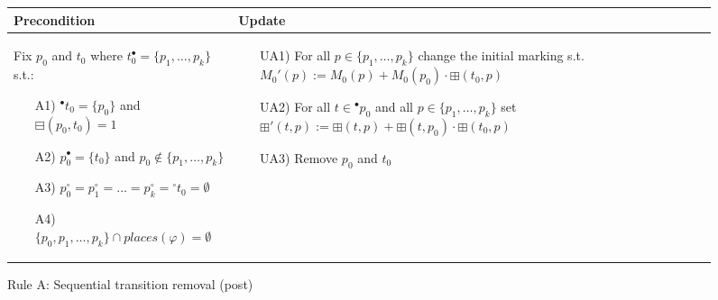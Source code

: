 \begin{figure}[h]
    \begin{adjustbox}{center}
        \begin{tabular}{|p{70mm}|p{62mm}|} \hline
        Precondition & Update \\ \hline
        Fix $p_0$ and $t_0$ where $t_0^\bullet=\{p_1,\dotsc,p_k\}$ s.t.:
        \begin{itemize}[leftmargin=10mm]
            \item[A1)] ${}^\bullet t_0=\{p_0\}$ and $\boxminus(p_0, t_0)=1$
            \item[A2)] $p_0^\bullet=\{t_0\}$ and $p_0\notin\{p_1,\dotsc,p_k\}$
            \item[A3)] $p_0^\circ=p_1^\circ=\dots=p_k^\circ={}^\circ t_0=\emptyset$
            \item[A4)] $\{p_0, p_1,\dotsc,p_k\}\cap places(\varphi)=\emptyset$
        \end{itemize} &
        \begin{itemize}[leftmargin=10mm]
            \item[UA1)] For all $p\in\{p_1,\dotsc,p_k\}$ change the initial marking s.t.\ $M_0'(p):=M_0(p)+M_0(p_0)\cdot\boxplus(t_0, p)$
            \item[UA2)] For all $t\in{}^\bullet p_0$ and all $p\in\{p_1,\dotsc,p_k\}$ set $\boxplus'(t,p):=\boxplus(t,p)+\boxplus(t,p_0)\cdot\boxplus(t_0,p)$
            \item[UA3)] Remove $p_0$ and $t_0$
        \end{itemize} \\ \hline
        \end{tabular}
    \end{adjustbox}
    \caption{Rule A: Sequential transition removal (post)}
    \label{fig:rule_a_post}
\end{figure}
